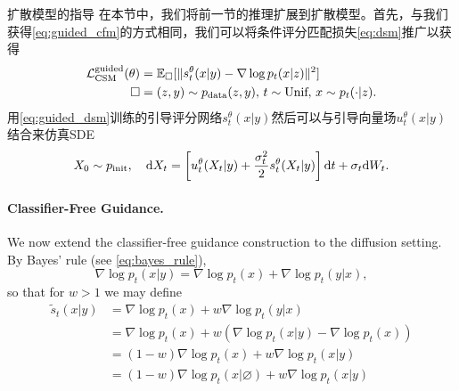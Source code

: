 扩散模型的指导
在本节中，我们将前一节的推理扩展到扩散模型。首先，与我们获得\cref{eq:guided_cfm}的方式相同，我们可以将条件评分匹配损失\cref{eq:dsm}推广以获得
\begin{align}
    \label{eq:guided_dsm}
    \mathcal{L}_{\text{CSM}}^{\text{guided}}(\theta) &= \mathbb{E}_{\square}[\|s_t^\theta(x|y) - \nabla\log p_t(x|z)\|^2]\\
    \square &= (z,y)\sim p_{\rm{data}}(z,y), \,t\sim \text{Unif},\,x\sim p_t(\cdot|z).
\end{align}
用\cref{eq:guided_dsm}训练的引导评分网络$s_t^\theta(x|y)$然后可以与引导向量场$u_t^\theta(x|y)$结合来仿真SDE
\begin{equation*}
    X_0 \sim p_{\rm{init}},\quad \mathrm{d} X_t = \left[u_t^\theta(X_t|y)+\frac{\sigma_t^2}{2}s_t^\theta(X_t|y)\right]\mathrm{d} t + \sigma_t\mathrm{d} W_t.
\end{equation*}

\paragraph{Classifier-Free Guidance.} We now extend the classifier-free guidance construction to the diffusion setting. By Bayes' rule (see \cref{eq:bayes_rule}),
\begin{equation*}
    \nabla \log p_t(x|y) = \nabla \log p_t(x) + \nabla \log p_t(y|x),
\end{equation*}
so that for  $w > 1$ we may define
\begin{align*}
    \tilde{s}_t(x|y) &= \nabla \log p_t(x) + w \nabla \log p_t(y|x)\\
                    &= \nabla \log p_t(x) + w (\nabla \log p_t(x|y) - \nabla \log p_t(x))\\
                    &= (1-w) \nabla \log p_t(x) + w \nabla \log p_t(x|y)\\
                    &= (1-w) \nabla \log p_t(x|\varnothing) + w \nabla \log p_t(x|y)
\end{align*}


